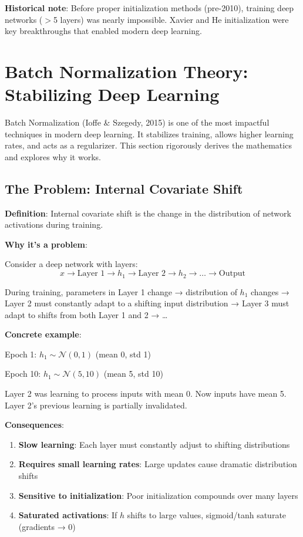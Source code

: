 \textbf{Historical note}: Before proper initialization methods (pre-2010), training deep networks ($>$5 layers) was nearly impossible. Xavier and He initialization were key breakthroughs that enabled modern deep learning.

\section{Batch Normalization Theory: Stabilizing Deep Learning}

Batch Normalization (Ioffe \& Szegedy, 2015) is one of the most impactful techniques in modern deep learning. It stabilizes training, allows higher learning rates, and acts as a regularizer. This section rigorously derives the mathematics and explores why it works.

\subsection{The Problem: Internal Covariate Shift}

\textbf{Definition}: Internal covariate shift is the change in the distribution of network activations during training.

\textbf{Why it's a problem}:

Consider a deep network with layers:
\[
x \to \text{Layer 1} \to h_1 \to \text{Layer 2} \to h_2 \to \ldots \to \text{Output}
\]

During training, parameters in Layer 1 change → distribution of $h_1$ changes → Layer 2 must constantly adapt to a shifting input distribution → Layer 3 must adapt to shifts from both Layer 1 and 2 → \ldots

\textbf{Concrete example}:

Epoch 1: $h_1 \sim \mathcal{N}(0, 1)$ (mean 0, std 1)

Epoch 10: $h_1 \sim \mathcal{N}(5, 10)$ (mean 5, std 10)

Layer 2 was learning to process inputs with mean 0. Now inputs have mean 5. Layer 2's previous learning is partially invalidated.

\textbf{Consequences}:
\begin{enumerate}
\item \textbf{Slow learning}: Each layer must constantly adjust to shifting distributions
\item \textbf{Requires small learning rates}: Large updates cause dramatic distribution shifts
\item \textbf{Sensitive to initialization}: Poor initialization compounds over many layers
\item \textbf{Saturated activations}: If $h$ shifts to large values, sigmoid/tanh saturate (gradients → 0)
\end{enumerate}

